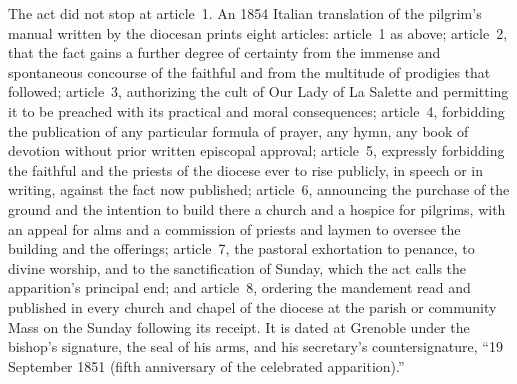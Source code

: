 The act did not stop at article~1. An 1854 Italian translation of
the pilgrim's manual written by the diocesan 
prints eight articles: article~1 as above; article~2, that the fact
gains a further degree of certainty from the immense and spontaneous
concourse of the faithful and from the multitude of prodigies that
followed; article~3, authorizing the cult of Our Lady of La Salette
and permitting it to be preached with its practical and moral
consequences; article~4, forbidding the publication of any
particular formula of prayer, any hymn, any book of devotion without
prior written episcopal approval; article~5, expressly forbidding
the faithful and the priests of the diocese ever to rise publicly,
in speech or in writing, against the fact now published; article~6,
announcing the purchase of the ground and the intention to build
there a church and a hospice for pilgrims, with an appeal for alms
and a commission of priests and laymen to oversee the building and
the offerings; article~7, the pastoral exhortation to penance, to
divine worship, and to the sanctification of Sunday, which the act
calls the apparition's principal end; and article~8, ordering the
mandement read and published in every church and chapel of the
diocese at the parish or community Mass on the Sunday following its
receipt. It is dated at Grenoble under the bishop's signature, the
seal of his arms, and his secretary's countersignature, ``19
September 1851 (fifth anniversary of the celebrated
apparition).''

